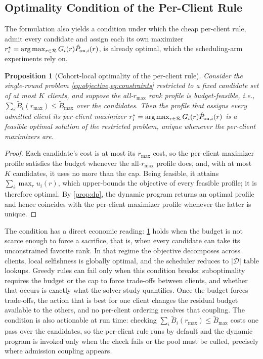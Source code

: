 \documentclass[a4paper,fleqn]{cas-dc}
\newtheorem{proposition}{Proposition}
\begin{document}
\subsection{Optimality Condition of the Per-Client Rule}
The formulation also yields a condition under which the cheap per-client rule, admit every candidate and assign each its own maximizer $r_i^\star=\arg\max_{r\in\mathcal R}G_i(r)\hat P_{{\rm on},i}(r)$, is already optimal, which the scheduling-arm experiments rely on.
\begin{proposition}[Cohort-local optimality of the per-client rule]
\label{prop:cohort}
Consider the single-round problem \cref{eq:objective,eq:constraints} restricted to a fixed candidate set of at most $K$ clients, and suppose the all-$r_{\max}$ rank profile is budget-feasible, i.e., $\sum_i \widetilde B_i(r_{\max})\le\widetilde B_{\max}$ over the candidates. Then the profile that assigns every admitted client its per-client maximizer $r_i^\star=\arg\max_{r\in\mathcal R}G_i(r)\hat P_{{\rm on},i}(r)$ is a feasible optimal solution of the restricted problem, unique whenever the per-client maximizers are.
\end{proposition}
\begin{proof}
Each candidate's cost is at most its $r_{\max}$ cost, so the per-client maximizer profile satisfies the budget whenever the all-$r_{\max}$ profile does, and, with at most $K$ candidates, it uses no more than the cap. Being feasible, it attains $\sum_i\max_r u_i(r)$, which upper-bounds the objective of every feasible profile; it is therefore optimal. By \cref{prop:dp}, the dynamic program returns an optimal profile and hence coincides with the per-client maximizer profile whenever the latter is unique.
\end{proof}
The condition has a direct economic reading: \cref{prop:cohort} holds when the budget is not scarce enough to force a sacrifice, that is, when every candidate can take its unconstrained favorite rank. In that regime the objective decomposes across clients, local selfishness is globally optimal, and the scheduler reduces to $|\mathcal D|$ table lookups. Greedy rules can fail only when this condition breaks: suboptimality requires the budget or the cap to force trade-offs between clients, and whether that occurs is exactly what the solver study quantifies. Once the budget forces trade-offs, the action that is best for one client changes the residual budget available to the others, and no per-client ordering resolves that coupling. The condition is also actionable at run time: checking $\sum_i \widetilde B_i(r_{\max})\le\widetilde B_{\max}$ costs one pass over the candidates, so the per-client rule runs by default and the dynamic program is invoked only when the check fails or the pool must be culled, precisely where admission coupling appears.
\end{document}
